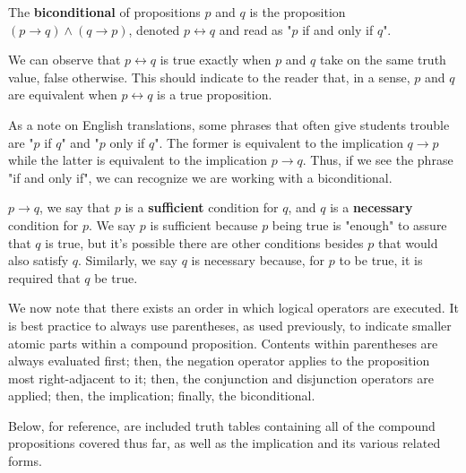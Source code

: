         \begin{definition}[Biconditional]\label{def:bicon}
            The \textbf{biconditional} of propositions $p$ and $q$ is the proposition $(p \to q) \land (q \to p)$, denoted $p \longleftrightarrow q$ and read as "$p$ if and only if $q$". 
        \end{definition}
        
        We can observe that $p \longleftrightarrow q$ is true exactly when $p$ and $q$ take on the same truth value, false otherwise. This should indicate to the reader that, in a sense, $p$ and $q$ are equivalent when $p \longleftrightarrow q$ is a true proposition.
        
        As a note on English translations, some phrases that often give students trouble are "$p$ if $q$" and "$p$ only if $q$". The former is equivalent to the implication $q \to p$ while the latter is equivalent to the implication $p \to q$. Thus, if we see the phrase "if and only if", we can recognize we are working with a biconditional. 

         $p \to q$, we say that $p$ is a \textbf{sufficient} condition for $q$, and $q$ is a \textbf{necessary} condition for $p$. We say $p$ is sufficient because $p$ being true is "enough" to assure that $q$ is true, but it's possible there are other conditions besides $p$ that would also satisfy $q$. Similarly, we say $q$ is necessary because, for $p$ to be true, it is required that $q$ be true.

        We now note that there exists an order in which logical operators are executed. It is best practice to always use parentheses, as used previously, to indicate smaller atomic parts within a compound proposition. Contents within parentheses are always evaluated first; then, the negation operator applies to the proposition most right-adjacent to it; then, the conjunction and disjunction operators are applied; then, the implication; finally, the biconditional.

        Below, for reference, are included truth tables containing all of the compound propositions covered thus far, as well as the implication and its various related forms.

        
        

